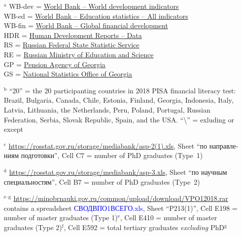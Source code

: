 \begin{singlespace} \small
\begin{itemize}
    \item[$^\text{a}$] WB-dev = \href{https://databank.worldbank.org/source/world-development-indicators}{World Bank -- World development indicators}\\
        WB-ed = \href{https://databank.worldbank.org/source/education-statistics-^-all-indicators}{World Bank -- Education statistics -- All indicators}\\
        WB-fin = \href{https://databank.worldbank.org/source/global-financial-development}{World Bank -- Global financial development}\\
        HDR = \href{http://hdr.undp.org/en/data}{Human Development Reports -- Data}\\
        RS = \href{https://rosstat.gov.ru/}{Russian Federal State Statistic Service}\\
        RE = \href{https://minobrnauki.gov.ru}{Russian Ministry of Education and Science}\\
        GP = \href{https://www.pensions.ge}{Pension Agency of Georgia}\\
        GS = \href{https://www.geostat.ge}{National Statistics Office of Georgia}
    \item[$^\text{b}$] ``20'' = the 20 participanting countries in 2018 \textsc{PISA} financial literacy test: Brazil, Bulgaria, Canada, Chile, Estonia, Finland, Georgia, Indonesia, Italy, Latvia, Lithuania, the Netherlands, Peru, Poland, Portugal, Russian Federation, Serbia, Slovak Republic, Spain, and the USA. ``\textbackslash'' = exluding or except
    \item[$^\text{c}$] \href{https://rosstat.gov.ru/storage/mediabank/asp-2(1).xls}{https://rosstat.gov.ru/storage/mediabank/asp-2(1).xls}, Sheet ``\foreignlanguage{russian}{по направлениям подготовки}'', Cell C7 = number of PhD graduates \mbox{(Type 1)}
    \item[$^\text{d}$] \href{https://rosstat.gov.ru/storage/mediabank/asp-3.xls}{https://rosstat.gov.ru/storage/mediabank/asp-3.xls}, Sheet ``\foreignlanguage{russian}{по научным специальностям}'', Cell B7 = number of PhD graduates \mbox{(Type 2)}
    \item[$^\text{e--g}$] \href{https://minobrnauki.gov.ru/common/upload/download/VPO_1_2018.rar}{https://minobrnauki.gov.ru/common/upload/download/VPO{\textunderscore}1{\textunderscore}2018.rar} contains a spreadsheet \textcolor{blue}{\foreignlanguage{russian}{СВОД{\textunderscore}ВПО1{\textunderscore}ВСЕГО}.xls}, Sheet ``P2{\textunderscore}1{\textunderscore}3(1)'', Cell E198 = number of master graduates (Type 1)$^\text{e}$, Cell E410 = number of master graduates (Type 2)$^\text{f}$, Cell E592 = total tertiary graduates \emph{excluding} PhD$^\text{g}$

\end{itemize}
\end{singlespace}
